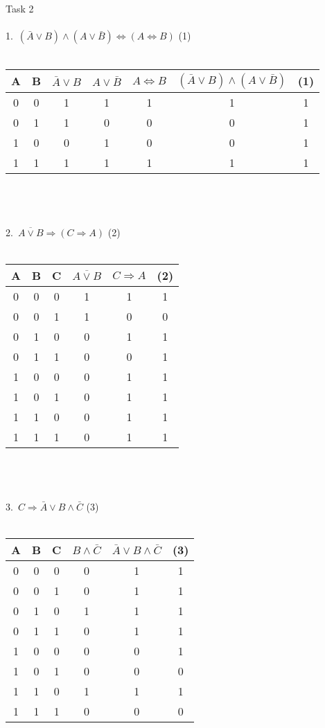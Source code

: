 \documentclass{article}
\begin{document}
Task 2 \\ \\
1.\ $ (\bar A \vee B) \wedge (A \vee \bar B) \Leftrightarrow (A  \Leftrightarrow B) $ \qquad \qquad (1) \\ \\
\begin{tabular}{ | c | c | c | c | c | c | c | }
A & B & $\bar A \vee B$ & $A \vee \bar B$ & $A \Leftrightarrow B$ & $(\bar A \vee B) \wedge (A \vee \bar B)$ & (1) \\
\hline
0 & 0 & 1 & 1 & 1 & 1 & 1 \\
\hline
0 & 1 & 1 & 0 & 0 & 0 & 1 \\
\hline
1 & 0 & 0 & 1 & 0 & 0 & 1 \\
\hline
1 & 1 & 1 & 1 & 1 & 1 & 1 \\
\hline
\end{tabular} \\ \\
 \\
2.\ $ \overline{A \vee B} \Rightarrow (C \Rightarrow A) $ \qquad \qquad (2) \\ \\
\begin{tabular}{ | c | c | c | c | c | c | }
A & B & C & $\overline{A \vee B}$ & $C \Rightarrow A$ & (2) \\
\hline
0 & 0 & 0 & 1 & 1 & 1 \\
\hline
0 & 0 & 1 & 1 & 0 & 0 \\
\hline
0 & 1 & 0 & 0 & 1 & 1 \\
\hline
0 & 1 & 1 & 0 & 0 & 1 \\
\hline
1 & 0 & 0 & 0 & 1 & 1 \\
\hline
1 & 0 & 1 & 0 & 1 & 1 \\
\hline
1 & 1 & 0 & 0 & 1 & 1 \\
\hline
1 & 1 & 1 & 0 & 1 & 1 \\
\hline
\end{tabular} \\ \\ 
\\
3.\ $ C \Rightarrow \bar A \vee B \wedge \bar C $ \qquad \qquad (3) \\ \\
\begin{tabular}{ | c | c | c | c | c | c | }
A & B & C & $B \wedge \bar C$ & $\bar A \vee B \wedge \bar C$ & (3) \\
\hline
0 & 0 & 0 & 0 & 1 & 1 \\
\hline
0 & 0 & 1 & 0 & 1 & 1 \\
\hline
0 & 1 & 0 & 1 & 1 & 1 \\
\hline
0 & 1 & 1 & 0 & 1 & 1 \\
\hline
1 & 0 & 0 & 0 & 0 & 1 \\
\hline
1 & 0 & 1 & 0 & 0 & 0 \\
\hline
1 & 1 & 0 & 1 & 1 & 1 \\
\hline
1 & 1 & 1 & 0 & 0 & 0 \\
\hline
\end{tabular}
\end{document}
